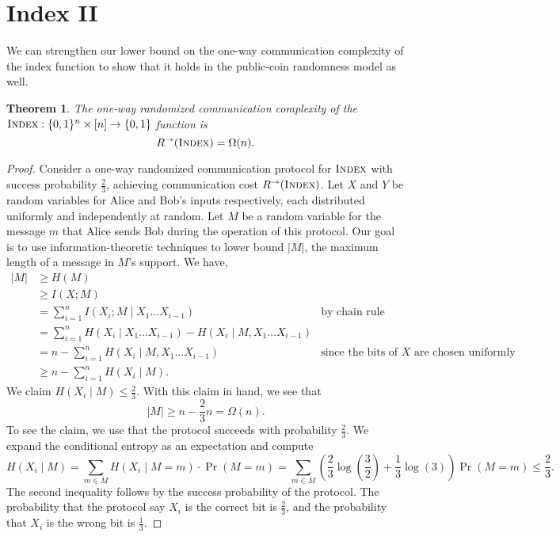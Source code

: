\documentclass[11pt]{amsart}
\theoremstyle{plain}
\newtheorem{theorem}{Theorem}
\theoremstyle{definition}
\theoremstyle{plain}
\newcommand{\Index}{\textsc{Index}}
\begin{document}
\newpage 
\section{Index II}

We can strengthen our lower bound on the one-way communication complexity of the index function to show that it holds in the public-coin randomness model as well.

\begin{theorem}
The one-way randomized communication complexity of the $\Index : \{0,1\}^n \times [n] \to \{0,1\}$ function is
\[
R^\rightarrow(\Index) = \Omega(n).
\]
\end{theorem}

\begin{proof}
Consider a one-way randomized communication protocol for $\Index$ with success probability $\frac{2}{3}$, achieving communication cost $R^\rightarrow(\Index)$. Let $X$ and $Y$ be random variables for Alice and Bob's inputs respectively, each distributed uniformly and independently at random. Let $M$ be a random variable for the message $m$ that Alice sends Bob during the operation of this protocol. Our goal is to use information-theoretic techniques to lower bound $|M|$, the maximum length of a message in $M$'s support. We have,
\begin{align*}
|M| &\geq H(M)\\
&\geq I(X;M) \\
&=\sum_{i=1}^n I(X_i; M \mid X_1\dots X_{i-1}) &\text{by chain rule} \\
&=\sum_{i=1}^n H(X_i\mid X_1\dots X_{i-1}) - H(X_i\mid M, X_1\dots X_{i-1})\\
&= n - \sum_{i=1}^n H(X_i\mid M, X_1\dots X_{i-1}) &\text{since the bits of $X$ are chosen uniformly independently} \\
&\geq n-\sum_{i=1}^n H(X_i\mid M).
\end{align*} 
We claim $H(X_i\mid M)\leq \frac{2}{3}$. With this claim in hand, we see that
$$|M| \geq n-\frac{2}{3}n =\Omega(n).$$
To see the claim, we use that the protocol succeeds with probability $\frac{2}{3}$. We expand the conditional entropy as an expectation and compute
$$H(X_i\mid M) = \sum_{m\in M} H(X_i\mid M=m)\cdot \Pr(M=m) = \sum_{m\in M}(\frac{2}{3}\log(\frac{3}{2}) + \frac{1}{3}\log(3))\Pr(M=m) \leq \frac{2}{3}.$$
The second inequality follows by the success probability of the protocol. The probability that the protocol say $X_i$ is the correct bit is $\frac{2}{3}$, and the probability that $X_i$ is the wrong bit is $\frac{1}{3}$.
\end{proof}
\end{document}
